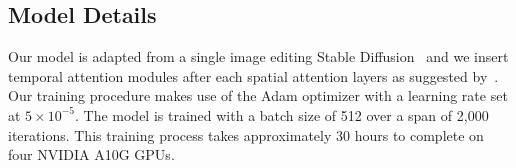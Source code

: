 
\subsection{Model Details}\label{sec.details}
Our model is adapted from a single image editing Stable Diffusion~\cite{brooks2023instructpix2pix} and we insert temporal attention modules after each spatial attention layers as suggested by~\cite{guo2023animatediff}. Our training procedure makes use of the Adam optimizer with a learning rate set at $5 \times 10^{-5}$. The model is trained with a batch size of 512 over a span of 2,000 iterations. This training process takes approximately 30 hours to complete on four NVIDIA A10G GPUs.


